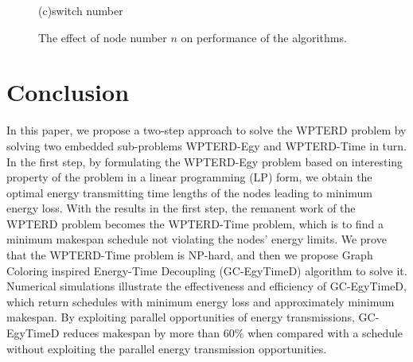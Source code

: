 \documentclass[journal,10pt]{IEEEtran}
\begin{document}
\begin{figure}[!htbp]
{\hspace{0.01\textwidth}%
\begin{minipage}[c]{0.32\textwidth}
\parbox{\linewidth}{\centering\small{(c)switch number}}
\end{minipage}
}
\caption{The effect of node number $n$ on performance of the algorithms.}
\label{fig_sim_n}
\end{figure}


\section{Conclusion}
\label{sec_conclusion}
In this paper, we propose a two-step approach to solve the WPTERD problem by solving two embedded sub-problems WPTERD-Egy and WPTERD-Time in turn. In the first step, by formulating the WPTERD-Egy problem based on interesting property of the problem in a linear programming (LP) form, we obtain the optimal energy transmitting time lengths of the nodes leading to minimum energy loss. With the results in the first step, the remanent work of the WPTERD problem becomes the WPTERD-Time problem, which is to find a minimum makespan schedule not violating the nodes' energy limits. We prove that the WPTERD-Time problem is NP-hard, and then we propose Graph Coloring inspired Energy-Time Decoupling (GC-EgyTimeD) algorithm to solve it. Numerical simulations illustrate the effectiveness and efficiency of GC-EgyTimeD, which return schedules with minimum energy loss and approximately minimum makespan. By exploiting parallel opportunities of energy transmissions, GC-EgyTimeD reduces makespan by more than 60\% when compared with a schedule without exploiting the parallel energy transmission opportunities.
\end{document}
